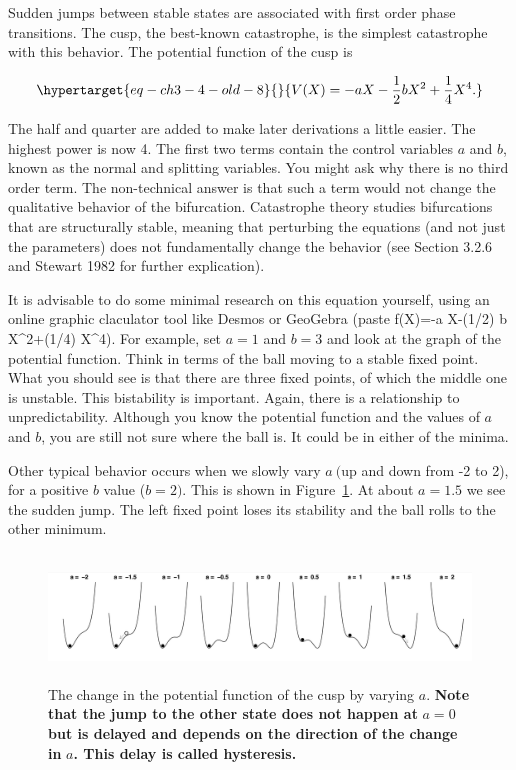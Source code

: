 \documentclass[
  letterpaper,
]{scrbook}
\begin{document}
Sudden jumps between stable states are associated with first order phase
transitions. The cusp, the best-known catastrophe, is the simplest
catastrophe with this behavior. The potential function of the cusp is

\begin{equation}\protect\hypertarget{eq-ch3-4-old-8}{}{ V(X) = - aX - \frac{1}{2}bX^{2} + \frac{1}{4}X^{4}. }\label{eq-ch3-4-old-8}\end{equation}

The half and quarter are added to make later derivations a little
easier. The highest power is now 4. The first two terms contain the
control variables \(a\) and \(b\), known as the normal and splitting
variables. You might ask why there is no third order term. The
non-technical answer is that such a term would not change the
qualitative behavior of the bifurcation. Catastrophe theory studies
bifurcations that are structurally stable, meaning that perturbing the
equations (and not just the parameters) does not fundamentally change
the behavior (see Section 3.2.6 and Stewart 1982 for further
explication).

It is advisable to do some minimal research on this equation yourself,
using an online graphic claculator tool like Desmos or GeoGebra (paste
f(X)=-a X-(1/2) b X\^{}2+(1/4) X\^{}4). For example, set \(a = 1\) and
\(b = 3\) and look at the graph of the potential function. Think in
terms of the ball moving to a stable fixed point. What you should see is
that there are three fixed points, of which the middle one is unstable.
This bistability is important. Again, there is a relationship to
unpredictability. Although you know the potential function and the
values of \(a\) and \(b\), you are still not sure where the ball is. It
could be in either of the minima.

Other typical behavior occurs when we slowly vary \(a\ (\)up and down
from -2 to 2), for a positive \(b\) value (\(b = 2).\) This is shown in
Figure~\ref{fig-ch3-img7-old-19}. At about \(a = 1.5\) we see the sudden
jump. The left fixed point loses its stability and the ball rolls to the
other minimum.

\begin{figure}

{\centering \includegraphics[width=6.26389in,height=1.32639in]{media/ch3/image7.jpg}

}

\caption{\label{fig-ch3-img7-old-19}The change in the potential function
of the cusp by varying \(a\). \textbf{Note that the jump to the other
state does not happen at} \(a=0\) \textbf{but is delayed and depends on
the direction of the change in} \(a\)\textbf{. This delay is called
hysteresis.}}

\end{figure}
\end{document}
